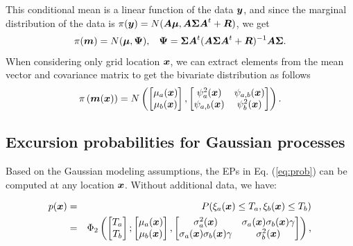 \documentclass[aoas]{imsart}
\begin{document}
This conditional mean is a linear function of the data ${\boldsymbol y}$, and
since the marginal distribution of the data is
$\pi ({\boldsymbol y})= N( {\boldsymbol A} {\boldsymbol \mu},{\boldsymbol A} {\boldsymbol \Sigma} {\boldsymbol A}^t+{\boldsymbol R})$, we get
\begin{equation}\label{distxi} \pi(\bm)= N(\bmu , \bPsi), \hspace{3mm}
  \bPsi=\bSigma \bA^t (\bA \bSigma \bA^t+\bR)^{-1} \bA \bSigma.
\end{equation} When considering only grid location ${\boldsymbol x}$, we can
extract elements from the mean vector and covariance matrix to get the
bivariate distribution as follows \begin{equation}\label{dist_mxi} \pi
  \left( \bm(\bx) \right) = N \left( \begin{bmatrix}
      \mu_{a}(\bx) \\
      \mu_{b}(\bx) \end{bmatrix}, \begin{bmatrix}
      \psi^2_{a}(\bx) & \psi_{a,b}(\bx)\\
      \psi_{a,b}(\bx) & \psi^2_{b}(\bx) \end{bmatrix} \right).
\end{equation}


\subsection{Excursion probabilities for Gaussian processes}

Based on the Gaussian modeling assumptions, the EPs in Eq.
(\ref{eq:prob}) can be computed at any location ${\boldsymbol x}$. Without
additional data, we have:

\begin{eqnarray}\label{eq:prob_mv0}
 p(\bx) &=& P(\xi_a(\bx) \leq T_a, \xi_b(\bx) \leq T_b) \nonumber \\
 &=& \Phi_2 \begin{pmatrix} 
\begin{bmatrix} T_a\\
T_b
\end{bmatrix};
\begin{bmatrix} \mu_{a}(\bx)\\
\mu_{b}(\bx)
\end{bmatrix},\begin{bmatrix}
\sigma_{a}^2(\bx) & \sigma_{a}(\bx)\sigma_{b}(\bx) \gamma  \\
\sigma_{a}(\bx)\sigma_{b}(\bx) \gamma  & \sigma_{b}^2(\bx)  
\end{bmatrix}\end{pmatrix},
\end{eqnarray}
\end{document}
